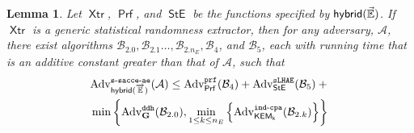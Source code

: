 \documentclass[USenglish,oneside,twocolumn]{article}
\theoremstyle{dgthm}
\newtheorem{lemma}[theorem]{Lemma}
\theoremstyle{dgdef}
\newcommand{\Protocol}[1]{\operatorname{\mathsf{#1}}}
\newcommand{\hybrid}{{\sf {hybrid}}}
\newcommand{\AlgorithmName}[1]{\operatorname{\mathsf{#1}}}
\newcommand{\PRF}{\AlgorithmName{Prf}}
\newcommand{\XTR}{\AlgorithmName{Xtr}}
\newcommand{\STE}{\AlgorithmName{StE}}
\newcommand{\Oracle}[1]{\mathcal #1}
\newcommand{\Experiment}[1]{\operatorname{\tt{#1}}}
\newcommand{\Algorithm}[1]{\mathcal #1}
\newcommand{\AdvName}[2]{\operatorname{\mathrm{Adv}_{\Protocol{#1}}^{\Experiment{#2}}}}
\newcommand{\Adv}[3]{\AdvName{#1}{#2}(\Algorithm{#3})}
\newcommand{\SAcceAeHybridK}[1]{\Adv{hybrid(\overrightarrow{\mathbb{E}})}{s-sacce-ae}{#1}}
\newcommand{\IndCpa}[2]{\Adv{#1}{ind-cpa}{#2}}
\newcommand{\AdvPrf}[2]{\Adv{#1}{prf}{#2}}
\newcommand{\AdvDdh}[1]{\Adv{\mathbf{G}}{ddh}{#1}}
\newcommand{\AdvSlhae}[1]{\Adv{StE}{sLHAE}{#1}}
\begin{document}
\begin{lemma}\label{lem:acceae}
  Let $\XTR$, $\PRF$, and $\STE$ be the functions specified by $\hybrid(\vec{\mathbb{E}})$.
  If $\XTR$ is a generic statistical randomness extractor, then for any adversary,
  $\Oracle{A}$, there exist algorithms $\Oracle{B_{2.0}}, \Oracle{B_{2.1}}\dots,
  \Oracle{B_{2.n_E}}, \Oracle{B_4}$, and $\Oracle{B_5}$, each with running time
  that is an additive constant greater than that of $\Oracle{A}$, such that
  \begin{multline}
    \SAcceAeHybridK{A} \le \AdvPrf{\PRF}{B_4} + \AdvSlhae{B_5} +{}\\
    \min\left\{\AdvDdh{B_{2.0}}, \min_{1\le k\le n_E}\left\{\IndCpa{KEM_k}{B_{2.k}}\right\}\right\}\notag
  \end{multline}
\end{lemma}
\end{document}
